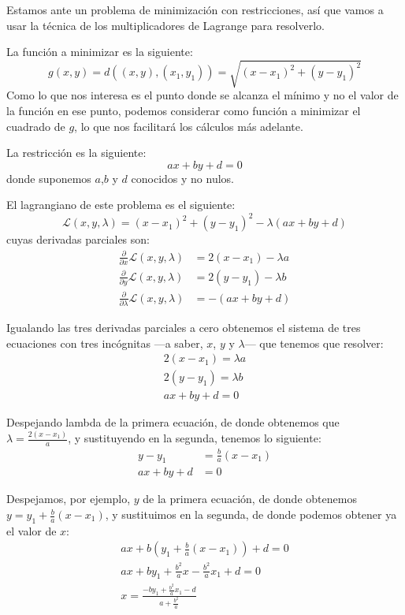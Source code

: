\documentclass[a4paper, 11pt]{article}
\begin{document}
      \begin{solucion}
          Estamos ante un problema de minimización con restricciones, así que vamos a usar la técnica de los multiplicadores de Lagrange para resolverlo.

          La función a minimizar es la siguiente:
          \[
          g(x,y) = d((x,y),(x_1,y_1)) = \sqrt{(x-x_1)^2 + (y-y_1)^2}
          \]
          Como lo que nos interesa es el punto donde se alcanza el mínimo y no el valor de la función en ese punto, podemos considerar como función a minimizar el cuadrado de $g$, lo que nos facilitará los cálculos más adelante.

          La restricción es la siguiente:
          \[
          ax + by + d = 0
          \]
          donde suponemos $a$,$b$ y $d$ conocidos y no nulos.

          El lagrangiano de este problema es el siguiente:
          \[
          \mathcal{L}(x,y,\lambda) = (x-x_1)^2 + (y-y_1)^2 - \lambda(ax + by + d)
          \]
          cuyas derivadas parciales son:
          \begin{align*}
              \frac{\partial}{\partial x} \mathcal{L}(x,y,\lambda) &= 2(x-x_1) -\lambda a \\
              \frac{\partial}{\partial y} \mathcal{L}(x,y,\lambda) &= 2(y-y_1) -\lambda b \\
              \frac{\partial}{\partial \lambda} \mathcal{L}(x,y,\lambda) &= - (ax + by + d)
          \end{align*}

          Igualando las tres derivadas parciales a cero obtenemos el sistema de tres ecuaciones con tres incógnitas ---a saber, $x$, $y$ y $\lambda$--- que tenemos que resolver:
          \begin{align*}
              2(x-x_1) = \lambda a \\
              2(y-y_1) = \lambda b \\
              ax + by + d = 0
          \end{align*}

          Despejando lambda de la primera ecuación, de donde obtenemos que $\lambda = \frac{2(x-x_1)}{a}$, y sustituyendo en la segunda, tenemos lo siguiente:
          \begin{align*}
              y-y_1 &= \frac{b}{a} (x-x_1) \\
              ax + by + d &= 0
          \end{align*}

          Despejamos, por ejemplo, $y$ de la primera ecuación, de donde obtenemos $y = y_1 + \frac{b}{a} (x-x_1)$, y sustituimos en la segunda, de donde podemos obtener ya el valor de $x$:
          \begin{align*}
              ax + b (y_1 + \frac{b}{a} (x-x_1)) + d = 0 \\
              ax + by_1 + \frac{b^2}{a}x - \frac{b^2}{a}x_1 + d = 0 \\
              x = \frac{-by_1 + \frac{b^2}{a}x_1 - d}{a + \frac{b^2}{a}}
          \end{align*}


\end{solucion}
\end{document}
